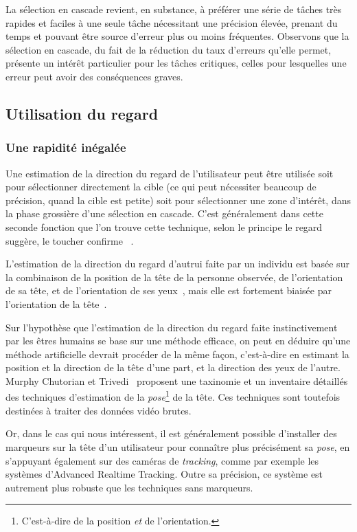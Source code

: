 	La sélection en cascade revient, en substance, à préférer une série de tâches très rapides et faciles à une seule tâche nécessitant une précision élevée, prenant du temps et pouvant être source d'erreur plus ou moins fréquentes. Observons que la sélection en cascade, du fait de la réduction du taux d'erreurs qu'elle permet, présente un intérêt particulier pour les tâches critiques, celles pour lesquelles une erreur peut avoir des conséquences graves.
	
	\subsection{Utilisation du regard}
	\subsubsection{Une rapidité inégalée}
	Une estimation de la direction du regard de l'utilisateur peut être utilisée soit pour sélectionner directement la cible (ce qui peut nécessiter beaucoup de précision, quand la cible est petite) soit pour sélectionner une zone d'intérêt, dans la phase grossière d'une sélection en cascade. C'est généralement dans cette seconde fonction que l'on trouve cette technique, selon le principe \og le regard suggère, le toucher confirme \fg{}~\cite{stellmach2012look}.

	L'estimation de la direction du regard d'autrui faite par un individu est basée sur la combinaison de la position de la tête de la personne observée, de l'orientation de sa tête, et de l'orientation de ses yeux~\cite{langton2004influence}, mais elle est fortement biaisée par l'orientation de la tête~\cite{wollaston1824apparent}.
	
	Sur l'hypothèse que l'estimation de la direction du regard faite instinctivement par les êtres humains se base sur une méthode efficace, on peut en déduire qu'une méthode artificielle devrait procéder de la même façon, c'est-à-dire en estimant la position et la direction de la tête d'une part, et la direction des yeux de l'autre. Murphy Chutorian et Trivedi~\cite{murphy2009head} proposent une taxinomie et un inventaire détaillés des techniques d'estimation de la \emph{pose}\footnote{C'est-à-dire de la position \emph{et} de l'orientation.} de la tête. Ces techniques sont toutefois destinées à traiter des données vidéo brutes.
	
	Or, dans le cas qui nous intéressent, il est généralement possible d'installer des marqueurs sur la tête d'un utilisateur pour connaître plus précisément sa \emph{pose}, en s'appuyant également sur des caméras de \emph{tracking}, comme par exemple les systèmes d'Advanced Realtime Tracking\footnotemark{}. Outre sa précision, ce système est autrement plus robuste que les techniques sans marqueurs.
	
